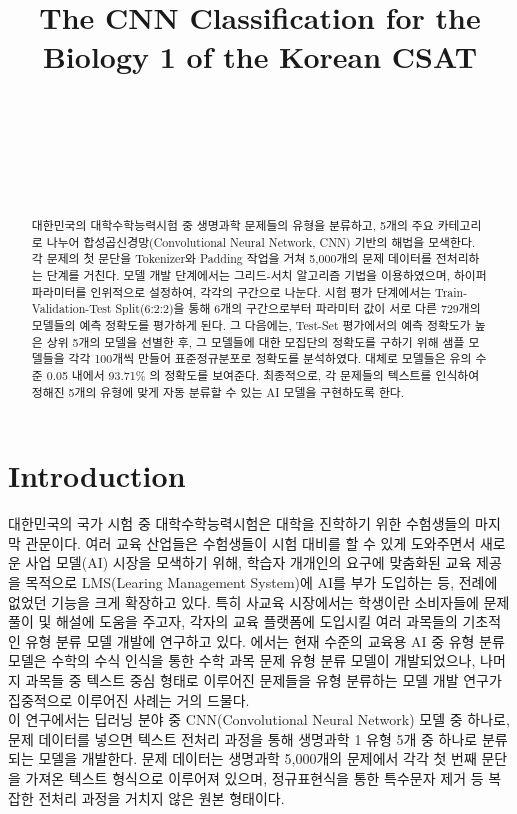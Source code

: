 \documentclass{jcse}
\title[JCSE Template Example]{The CNN Classification for the Biology 1 of the Korean CSAT}
\author{
	\authname{HaYoon Song$^*$} \\
	\affaddr{School of Computer Science,
	  Hongik University, Seoul, Korea}
	\email{librarymusik@gmail.com} \\
	\\
	\authname{HyeonSeop Shim$^*$} \\
	\affaddr{School of Computer Science,
	  Hongik University, Seoul, Korea}
	\email{B811101@g.hongik.ac.kr} \\
}
\begin{document}
\begin{abstract}
대한민국의 대학수학능력시험 중 생명과학 문제들의 유형을 분류하고, 5개의 주요 카테고리로 나누어 합성곱신경망(Convolutional Neural Network, CNN) 기반의 해법을 모색한다. 각 문제의 첫 문단을 Tokenizer와 Padding 작업을 거쳐 5,000개의 문제 데이터를 전처리하는 단계를 거친다. 모델 개발 단계에서는 그리드-서치 알고리즘 기법을 이용하였으며, 하이퍼파라미터를 인위적으로 설정하여, 각각의 구간으로 나눈다. 시험 평가 단계에서는 Train-Validation-Test Split(6:2:2)을 통해 6개의 구간으로부터 파라미터 값이 서로 다른 729개의 모델들의 예측 정확도를 평가하게 된다. 그 다음에는, Test-Set 평가에서의 예측 정확도가 높은 상위 5개의 모델을 선별한 후, 그 모델들에 대한 모집단의 정확도를 구하기 위해 샘플 모델들을 각각 100개씩 만들어 표준정규분포로 정확도를 분석하였다. 대체로 모델들은 유의 수준 0.05 내에서 93.71\% 의 정확도를 보여준다. 최종적으로, 각 문제들의 텍스트를 인식하여 정해진 5개의 유형에 맞게 자동 분류할 수 있는 AI 모델을 구현하도록 한다.
\end{abstract}

\maketitle

\section{Introduction} \label{s:intro}

대한민국의 국가 시험 중 대학수학능력시험은 대학을 진학하기 위한 수험생들의 마지막 관문이다. 
여러 교육 산업들은 수험생들이 시험 대비를 할 수 있게 도와주면서 새로운 사업 모델(AI) 시장을 모색하기 위해, 
학습자 개개인의 요구에 맞춤화된 교육 제공을 목적으로 LMS(Learing Management System)\cite{cite:lms}에 AI를 부가 도입하는 등, 전례에 없었던 기능을 크게 확장하고 있다.
특히 사교육 시장에서는 학생이란 소비자들에 문제 풀이 및 해설에 도움을 주고자, 각자의 교육 플랫폼에 도입시킬 여러 과목들의 기초적인 유형 분류 모델 개발에 연구하고 있다.
\cite{cite:handwriting1}에서는
현재 수준의 교육용 AI 중 유형 분류 모델은 수학의 수식 인식\cite{cite:MathFormulaRecognition}을 통한 수학 과목 문제 유형 분류 모델이 개발되었으나, 
나머지 과목들 중 텍스트 중심 형태로 이루어진 문제들을 유형 분류하는 모델 개발 연구가 집중적으로 이루어진 사례는 거의 드물다.
\\
이 연구에서는 딥러닝 분야 중 CNN(Convolutional Neural Network) 모델 중 하나로, 문제 데이터를 넣으면 텍스트 전처리 과정을 통해 생명과학 1 유형 5개 중 하나로 분류되는 모델을 개발한다. 문제 데이터는 생명과학 5,000개의 문제에서 각각 첫 번째 문단을 가져온 텍스트 형식으로 이루어져 있으며, 정규표현식을 통한 특수문자 제거 등 복잡한 전처리 과정을 거치지 않은 원본 형태이다.
\end{document}
